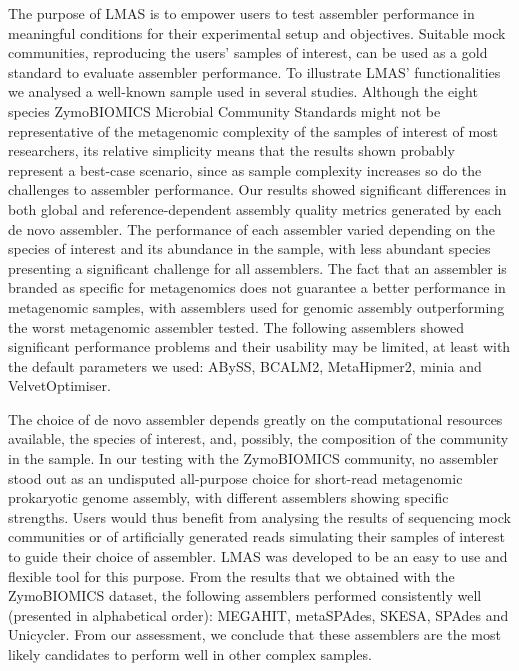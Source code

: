 The purpose of LMAS is to empower users to test assembler performance in meaningful conditions for their experimental setup and objectives. Suitable mock communities, reproducing the users’ samples of interest, can be used as a gold standard to evaluate assembler performance. To illustrate LMAS’ functionalities we analysed a well-known sample used in several studies. Although the eight species ZymoBIOMICS Microbial Community Standards might not be representative of the metagenomic complexity of the samples of interest of most researchers, its relative simplicity means that the results shown probably represent a best-case scenario, since as sample complexity increases so do the challenges to assembler performance. Our results showed significant differences in both global and reference-dependent assembly quality metrics generated by each de novo assembler. The performance of each assembler varied depending on the species of interest and its abundance in the sample, with less abundant species presenting a significant challenge for all assemblers. The fact that an assembler is branded as specific for metagenomics does not guarantee a better performance in metagenomic samples, with assemblers used for genomic assembly outperforming the worst metagenomic assembler tested. The following assemblers showed significant performance problems and their usability may be limited, at least with the default parameters we used: ABySS, BCALM2, MetaHipmer2, minia and VelvetOptimiser.

The choice of de novo assembler depends greatly on the computational resources available, the species of interest, and, possibly, the composition of the community in the sample. In our testing with the ZymoBIOMICS community, no assembler stood out as an undisputed all-purpose choice for short-read metagenomic prokaryotic genome assembly, with different assemblers showing specific strengths. Users would thus benefit from analysing the results of sequencing mock communities or of artificially generated reads simulating their samples of interest to guide their choice of assembler. LMAS was developed to be an easy to use and flexible tool for this purpose. From the results that we obtained with the ZymoBIOMICS dataset, the following assemblers performed consistently well (presented in alphabetical order): MEGAHIT, metaSPAdes, SKESA, SPAdes and Unicycler. From our assessment, we conclude that these assemblers are the most likely candidates to perform well in other complex samples.

